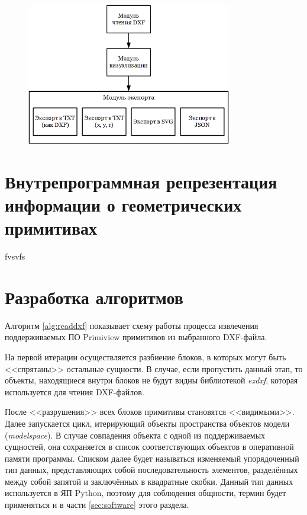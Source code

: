 \begin{figure}[H]
	\centering
	\includegraphics[width=0.8\textwidth]{figures/organisationsdiagramm.png}
	\label{fig:organisationsdiagramm}
\end{figure}

\section{Внутрепрограммная репрезентация информации о геометрических примитивах}
fvsvfs

\section{Разработка алгоритмов}
Алгоритм \ref{alg:readdxf} показывает схему работы процесса извлечения поддерживаемых ПО Primiview примитивов из выбранного DXF-файла.

На первой итерации осуществляется разбиение блоков, в которых могут быть <<спрятаны>> остальные сущности. В случае, если пропустить данный этап, то объекты, находящиеся внутри блоков не будут видны библиотекой \textit{ezdxf}, которая используется для чтения DXF-файлов.

После <<разрушения>> всех блоков примитивы становятся <<видимыми>>. Далее запускается цикл, итерирующий объекты пространства объектов модели (\textit{modelspace}). В случае совпадения объекта с одной из поддерживаемых сущностей, она сохраняется в список соответствующих объектов в оперативной памяти программы. Списком далее будет называться изменяемый упорядоченный тип данных, представляющих собой последовательность элементов, разделённых между собой запятой и заключённых в квадратные скобки. Данный тип данных используется в ЯП Python, поэтому для соблюдения общности, термин будет применяться и в части \ref{sec:software} этого раздела.

